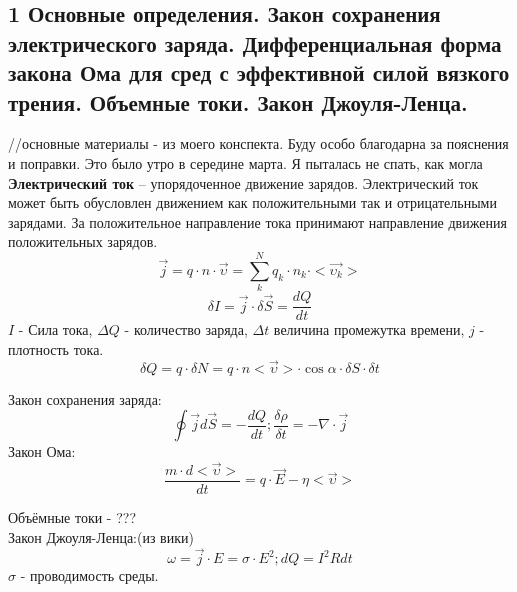 \documentclass[a4paper,12pt]{article}
\begin{document}
\subsection{1   Основные определения. Закон сохранения электрического заряда. Дифференциальная форма закона Ома для сред с эффективной силой вязкого трения. Объемные токи. Закон Джоуля-Ленца.}
//основные материалы - из моего конспекта. Буду особо благодарна за пояснения и поправки. Это было утро в середине марта. Я пыталась не спать, как могла\\
\textbf{Электрический ток} – упорядоченное движение зарядов. Электрический ток может быть обусловлен движением как положительными так и отрицательными зарядами. За положительное направление тока принимают направление движения положительных зарядов.\\
\begin{equation}
	\vec{j} = q \cdot n \cdot \vec{\upsilon} = \sum _k ^N q_k \cdot n_k \cdot <\vec{\upsilon _k}> 
\end{equation}
\begin{equation}
	\delta I = \vec{j} \cdot \delta \vec{S} = \frac{dQ}{dt}
\end{equation}
$I$ - Сила тока, $\Delta Q$ - количество заряда, $\Delta t$ величина промежутка времени, $j$ - плотность тока.\\
\begin{equation}
	\delta Q = q \cdot \delta N = q \cdot n <\vec{\upsilon}> \cdot \cos{\alpha} \cdot \delta S \cdot \delta t
\end{equation}

Закон сохранения заряда:\\
\begin{equation}
	\oint \vec{j} d \vec{S} = - \frac{dQ}{dt}; \frac{\delta \rho}{\delta t} = - \nabla \cdot \vec{j} 
\end{equation}
Закон Ома:\\
\begin{equation}
	\frac{m \cdot d<\vec{\upsilon}>}{dt} = q \cdot \vec{E} - \eta <\vec{\upsilon}>
\end{equation}

Объёмные токи - ???\\
Закон Джоуля-Ленца:(из вики)\\
\begin{equation}
	\omega = \vec{j} \cdot E = \sigma \cdot E^2; dQ = I^2Rdt
\end{equation}
$\sigma$ - проводимость среды.
\end{document}
